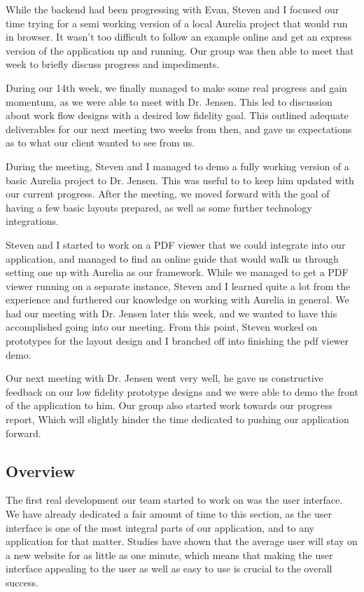 \documentclass[onecolumn, draftclsnofoot,10pt, compsoc]{IEEEtran}
\begin{document}
While the backend had been progressing with Evan, Steven and I focused our time trying for
a semi working version of a local Aurelia project that would run in browser. It wasn't too
difficult to follow an example online and get an express version of the application up and
running. Our group was then able to meet that week to briefly discuss progress and
impediments.

During our 14th week, we finally managed to make some real progress and gain momentum, as
we were able to meet with Dr. Jensen. This led to discussion about work flow designs with a
desired low fidelity goal. This outlined adequate deliverables for our next meeting two weeks
from then, and gave us expectations as to what our client wanted to see from us.

During the meeting, Steven and I managed to demo a fully working version of a basic Aurelia
project to Dr. Jensen. This was useful to to keep him updated with our current progress. After
the meeting, we moved forward with the goal of having a few basic layouts prepared, as well
as some further technology integrations.

Steven and I started to work on a PDF viewer that we could integrate into our application,
and managed to find an online guide that would walk us through setting one up with Aurelia
as our framework. While we managed to get a PDF viewer running on a separate instance, Steven
and I learned quite a lot from the experience and furthered our knowledge on working with
Aurelia in general. We had our meeting with Dr. Jensen later this week, and we wanted to have
this accomplished going into our meeting. From this point, Steven worked on prototypes for
the layout design and I branched off into finishing the pdf viewer demo.

Our next meeting with Dr. Jensen went very well, he gave us constructive feedback on our low
fidelity prototype designs and we were able to demo the front of the application to him.
Our group also started work towards our progress report, Which will slightly hinder the time
dedicated to pushing our application forward.

\subsection{Overview}
The first real development our team started to work on was the user interface. We have already
dedicated a fair amount of time to this section, as the user interface is one of the most
integral parts of our application, and to any application for that matter. Studies have shown
that the average user will stay on a new website for as little as one minute, which means
that making the user interface appealing to the user as well as easy to use is crucial to the
overall success.
\end{document}
